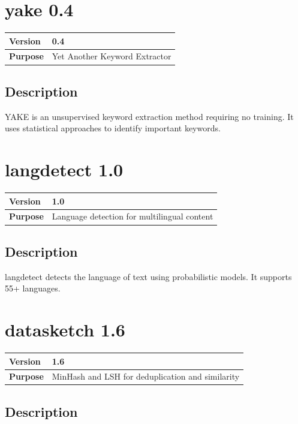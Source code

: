 \documentclass[12pt,a4paper]{report}
\begin{document}
\section{yake 0.4}

\begin{tabular}{|p{4cm}|p{10cm}|}
\hline
\textbf{Version} & 0.4 \\
\hline
\textbf{Purpose} & Yet Another Keyword Extractor \\
\hline
\end{tabular}

\subsection{Description}

YAKE is an unsupervised keyword extraction method requiring no training. It uses statistical approaches to identify important keywords.

\section{langdetect 1.0}

\begin{tabular}{|p{4cm}|p{10cm}|}
\hline
\textbf{Version} & 1.0 \\
\hline
\textbf{Purpose} & Language detection for multilingual content \\
\hline
\end{tabular}

\subsection{Description}

langdetect detects the language of text using probabilistic models. It supports 55+ languages.

\section{datasketch 1.6}

\begin{tabular}{|p{4cm}|p{10cm}|}
\hline
\textbf{Version} & 1.6 \\
\hline
\textbf{Purpose} & MinHash and LSH for deduplication and similarity \\
\hline
\end{tabular}

\subsection{Description}
\end{document}
